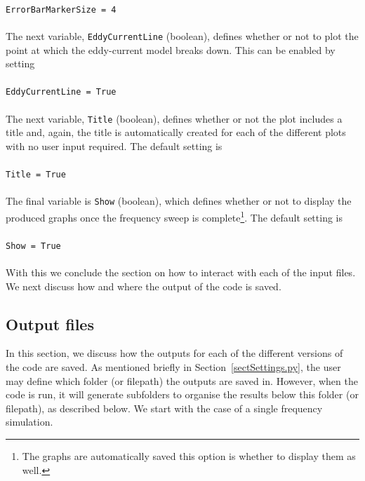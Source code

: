 \\
\texttt{ErrorBarMarkerSize = 4}\\
\\
The next variable, \texttt{EddyCurrentLine} (boolean), defines whether or not to plot the point at which the eddy-current model breaks down. This can be enabled by setting\\
\\
\texttt{EddyCurrentLine = True}\\
\\
The next variable, \texttt{Title} (boolean), defines whether or not the plot includes a title and, again, the title is automatically created for each of the different plots with no user input required. The default setting is\\
\\
\texttt{Title = True}\\
\\
The final variable is \texttt{Show} (boolean), which defines whether or not to display the produced graphs once the frequency sweep is complete\footnote{The graphs are automatically saved this option is whether to display them as well.}. The default setting is\\
\\
\texttt{Show = True}\\
\\
With this we conclude the section on how to interact with each of the input files. We next discuss how and where the output of the code is saved.\\

\subsection{Output files}\label{sectOutput}
In this section, we discuss how the outputs for each of the different versions of the code are saved. As mentioned briefly in Section~\ref{sectSettings.py}, the user may define which folder (or filepath) the outputs are saved in. However, when the code is run, it will generate subfolders to organise the results below this folder (or filepath), as described below. We start with the case of a single frequency simulation.\\


